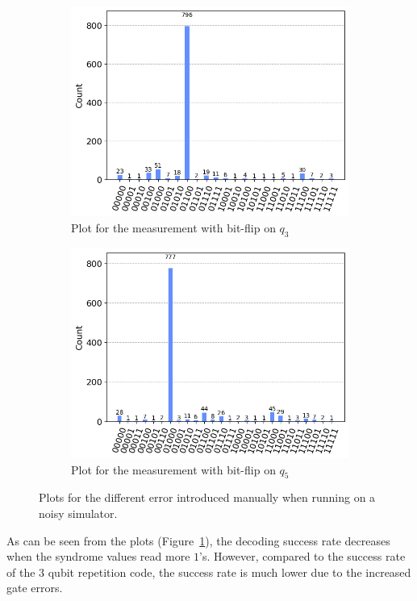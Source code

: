\documentclass[11pt]{article}
\begin{document}
\begin{figure}[h!]
\begin{subfigure}{0.5\linewidth}
        \includegraphics[width=\linewidth]{outputs/measure_5_3.png}
        \caption{Plot for the measurement with bit-flip on $q_3$}
    \end{subfigure}
    \begin{subfigure}{0.5\linewidth}
        \includegraphics[width=\linewidth]{outputs/measure_5_4.png}
        \caption{Plot for the measurement with bit-flip on $q_5$}
    \end{subfigure}
    \caption{Plots for the different error introduced manually when running on a noisy simulator.}\label{fig:5_measure}
\end{figure}

As can be seen from the plots (Figure~\ref{fig:5_measure}), the decoding success rate decreases when the syndrome values read more $1$'s. However, compared to the success rate of the 3 qubit repetition code, the success rate is much lower due to the increased gate errors.
\end{document}

